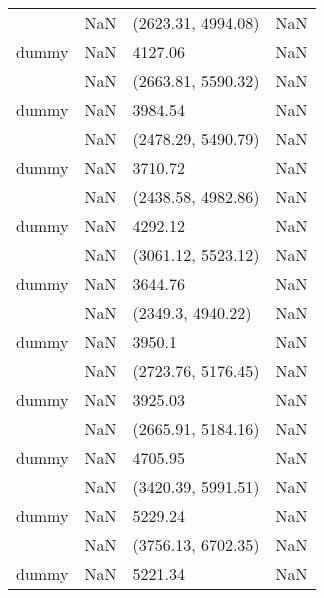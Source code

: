 \begin{tabular}{llll}
                &                     NaN &     (2623.31, 4994.08) &                   NaN \\
dummy           &                     NaN &                4127.06 &                   NaN \\
                &                     NaN &     (2663.81, 5590.32) &                   NaN \\
dummy           &                     NaN &                3984.54 &                   NaN \\
                &                     NaN &     (2478.29, 5490.79) &                   NaN \\
dummy           &                     NaN &                3710.72 &                   NaN \\
                &                     NaN &     (2438.58, 4982.86) &                   NaN \\
dummy           &                     NaN &                4292.12 &                   NaN \\
                &                     NaN &     (3061.12, 5523.12) &                   NaN \\
dummy           &                     NaN &                3644.76 &                   NaN \\
                &                     NaN &      (2349.3, 4940.22) &                   NaN \\
dummy           &                     NaN &                 3950.1 &                   NaN \\
                &                     NaN &     (2723.76, 5176.45) &                   NaN \\
dummy           &                     NaN &                3925.03 &                   NaN \\
                &                     NaN &     (2665.91, 5184.16) &                   NaN \\
dummy           &                     NaN &                4705.95 &                   NaN \\
                &                     NaN &     (3420.39, 5991.51) &                   NaN \\
dummy           &                     NaN &                5229.24 &                   NaN \\
                &                     NaN &     (3756.13, 6702.35) &                   NaN \\
dummy           &                     NaN &                5221.34 &                   NaN \\

\end{tabular}
